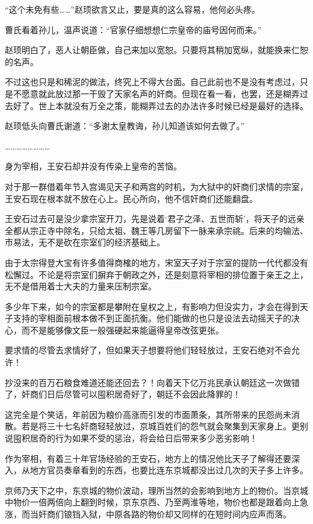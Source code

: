 “这个未免有些……”赵顼欲言又止，要是真的这么容易，他何必头疼。

曹氏看着孙儿，温声说道：“官家仔细想想仁宗皇帝的庙号因何而来。”

赵顼明白了，恶人让朝臣做，自己来加以宽恕。只要将其稍加宽纵，就能换来仁恕的名声。

不过这也只是和稀泥的做法，终究上不得大台面。自己此前也不是没有考虑过，只是不愿意就此放过那一干毁了天家名声的奸商。但现在看一看，也罢，还是糊弄过去好了。世上本就没有万全之策，能糊弄过去的办法许多时候已经是最好的选择。

赵顼低头向曹氏谢道：“多谢太皇教诲，孙儿知道该如何去做了。”

……………………

身为宰相，王安石却并没有传染上皇帝的苦恼。

对于那一群借着年节入宫谒见天子和两宫的时机，为大狱中的奸商们求情的宗室，王安石现在根本就不放在心上。民心所向，他不信奸商们还能翻盘。

王安石过去可是没少拿宗室开刀，先是说着‘君子之泽、五世而斩’，将天子的远亲全都从宗正寺中除名，只给太祖、魏王等几房留下一脉来承宗祧。后来的均输法、市易法，无不是砍在宗室们的经济基础上。

由于太宗得登大宝有许多值得商榷的地方，宋室天子对于宗室的提防一代代都没有松懈过。不论是将宗室们摒弃于朝政之外，还是刻意将宰相的排位置于亲王之上，无不是借用着士大夫的力量来压制宗室。

多少年下来，如今的宗室都是攀附在皇权之上，有影响力但没实力，才会在得到天子支持的宰相面前根本做不到正面抗衡。他们能做的也只是设法去动摇天子的决心，而不是能够像文臣一般强硬起来能逼得皇帝改弦更张。

要求情的尽管去求情好了，但如果天子想要将他们轻轻放过，王安石绝对不会允许！

抄没来的百万石粮食难道还能还回去？！向着天下亿万兆民承认朝廷这一次做错了，奸商们日后尽管可以囤积居奇好了，朝廷不会因此降罪的！

这完全是个笑话，年前因为粮价高涨而引发的市面萧条，其所带来的民怨尚未消散。若是将三十七名奸商轻轻放过，京城百姓们的怨气就会聚集到天家身上。更别说囤积居奇的行为如果不受的惩治，将会给日后带来多少恶劣影响！

作为宰相，有着三十年官场经验的王安石，地方上的情况他比天子了解得还要深入，从地方官员奏章看到的东西，也要比连东京城都没出过几次的天子多上许多。

京师乃天下之中，东京城的物价波动，理所当然的会影响到地方上的物价。当京城中物价一倍两倍向上翻到时候，京东京西、乃至两淮等地，物价也都是跟着向上急涨，而当奸商们锒铛入狱，中原各路的物价却又同样的在短时间内应声而落。

